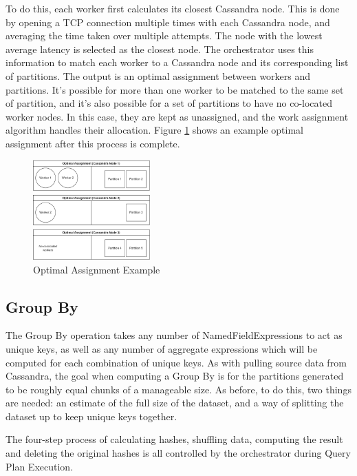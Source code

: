 To do this, each worker first calculates its closest Cassandra node. This is done by opening a TCP connection multiple times with each Cassandra node, and averaging the time taken over multiple attempts. The node with the lowest average latency is selected as the closest node. The orchestrator uses this information to match each worker to a Cassandra node and its corresponding list of partitions. The output is an optimal assignment between workers and partitions. It's possible for more than one worker to be matched to the same set of partition, and it's also possible for a set of partitions to have no co-located worker nodes. In this case, they are kept as unassigned, and the work assignment algorithm handles their allocation. Figure \ref{fig:optimal-assignment-example} shows an example optimal assignment after this process is complete.

\begin{figure}[h]
	\centering
	\includegraphics[width=0.4\textwidth]{chapters/diagrams/implementation/optimal-assignment-example}
	\caption{Optimal Assignment Example}
	\label{fig:optimal-assignment-example}
\end{figure}

\subsection{Group By}\label{subsec:group-by}
The Group By operation takes any number of NamedFieldExpressions to act as unique keys, as well as any number of aggregate expressions which will be computed for each combination of unique keys. As with pulling source data from Cassandra, the goal when computing a Group By is for the partitions generated to be roughly equal chunks of a manageable size. As before, to do this, two things are needed: an estimate of the full size of the dataset, and a way of splitting the dataset up to keep unique keys together.

The four-step process of calculating hashes, shuffling data, computing the result and deleting the original hashes is all controlled by the orchestrator during Query Plan Execution.

